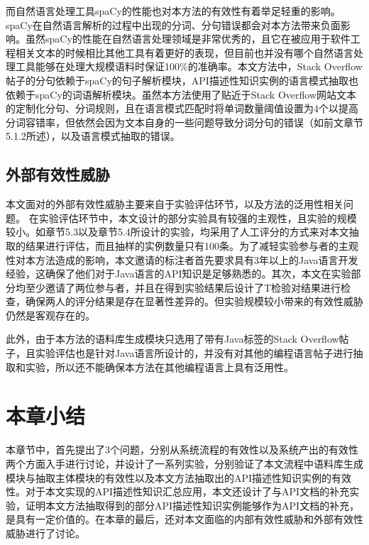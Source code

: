 而自然语言处理工具spaCy的性能也对本方法的有效性有着举足轻重的影响。spaCy在自然语言解析的过程中出现的分词、分句错误都会对本方法带来负面影响。虽然spaCy的性能在自然语言处理领域是非常优秀的，且它在被应用于软件工程相关文本的时候相比其他工具有着更好的表现，但目前也并没有哪个自然语言处理工具能够在处理大规模语料时保证100\%的准确率。本文方法中，Stack Overflow帖子的分句依赖于spaCy的句子解析模块，API描述性知识实例的语言模式抽取也依赖于spaCy的词语解析模块。虽然本方法使用了贴近于Stack Overflow网站文本的定制化分句、分词规则，且在语言模式匹配时将单词数量阈值设置为4个以提高分词容错率，但依然会因为文本自身的一些问题导致分词分句的错误（如前文章节5.1.2所述），以及语言模式抽取的错误。

\subsection{外部有效性威胁}
本文面对的外部有效性威胁主要来自于实验评估环节，以及方法的泛用性相关问题。
在实验评估环节中，本文设计的部分实验具有较强的主观性，且实验的规模较小。如章节5.3以及章节5.4所设计的实验，均采用了人工评分的方式来对本文抽取的结果进行评估，而且抽样的实例数量只有100条。为了减轻实验参与者的主观性对本方法造成的影响，本文邀请的标注者首先要求具有3年以上的Java语言开发经验，这确保了他们对于Java语言的API知识是足够熟悉的。其次，本文在实验部分均至少邀请了两位参与者，并且在得到实验结果后设计了T检验对结果进行检查，确保两人的评分结果是存在显著性差异的。但实验规模较小带来的有效性威胁仍然是客观存在的。

此外，由于本方法的语料库生成模块只选用了带有Java标签的Stack Overflow帖子，且实验评估也是针对Java语言所设计的，并没有对其他的编程语言帖子进行抽取和实验，所以还不能确保本方法在其他编程语言上具有泛用性。

\section{本章小结}
本章节中，首先提出了3个问题，分别从系统流程的有效性以及系统产出的有效性两个方面入手进行讨论，并设计了一系列实验，分别验证了本文流程中语料库生成模块与抽取主体模块的有效性以及本文方法抽取出的API描述性知识实例的有效性。对于本文实现的API描述性知识汇总应用，本文还设计了与API文档的补充实验，证明本文方法抽取得到的部分API描述性知识实例能够作为API文档的补充，是具有一定价值的。在本章的最后，还对本文面临的内部有效性威胁和外部有效性威胁进行了讨论。
